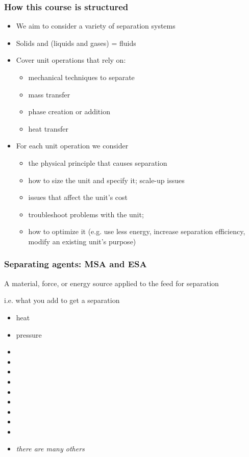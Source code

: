 \begin{frame}\frametitle{How this course is structured}
	\begin{itemize}
		\item	We aim to consider a variety of separation systems
		\item	Solids and (liquids and gases) = fluids
		\item	Cover unit operations that rely on:
		\begin{itemize}
			\item	mechanical techniques to separate
			\item	mass transfer
			\item	phase creation or addition
			\item	heat transfer
		\end{itemize}
		\item	For each unit operation we consider
		\begin{itemize}
			\item	the physical principle that causes separation
			\item	how to size the unit and specify it; scale-up issues
			\item	issues that affect the unit's cost
			\item	troubleshoot problems with the unit; 
			\item	how to optimize it (e.g. use less energy, increase separation efficiency, modify an existing unit's purpose)
			
		\end{itemize}
	\end{itemize}
\end{frame}

\begin{frame}\frametitle{Separating agents: MSA and ESA}	
	\begin{exampleblock}
		{A material, force, or energy source applied to the feed for separation }
	\end{exampleblock}
	\vspace{12pt}
	i.e. what you add to get a separation
	\vspace{12pt}
	\begin{itemize}
		\item	heat
		\item	pressure
		\pause
		\item	\iftoggle{instructor}{vacuum}{}
		\item	\iftoggle{instructor}{membrane}{}
		\item	\iftoggle{instructor}{filter media}{}
		\item	\iftoggle{instructor}{electric field}{}
		\item	\iftoggle{instructor}{flow}{}
		\item	\iftoggle{instructor}{temperature gradient}{}
		\item	\iftoggle{instructor}{concentration gradient}{}
		\item	\iftoggle{instructor}{gravitational field}{}
		\item	\iftoggle{instructor}{adsorbent}{}
		\item	\emph{there are many others}
	\end{itemize}
\end{frame}

